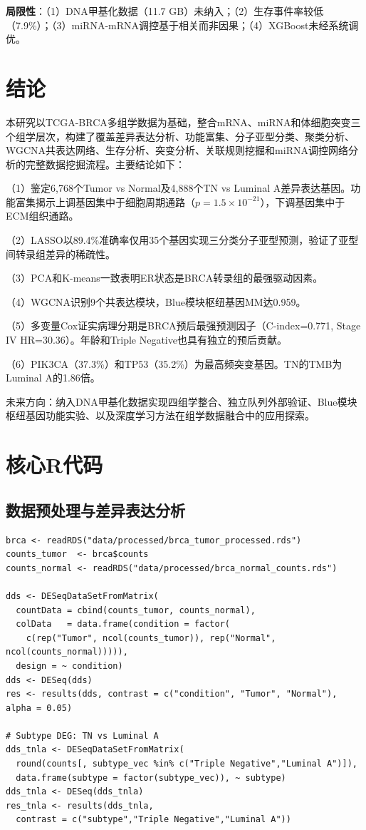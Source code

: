 \documentclass[12pt,a4paper]{ctexart}
\begin{document}
\textbf{局限性}：（1）DNA甲基化数据（11.7 GB）未纳入；（2）生存事件率较低（7.9\%）；（3）miRNA-mRNA调控基于相关而非因果；（4）XGBoost未经系统调优。

\section{结论}
本研究以TCGA-BRCA多组学数据为基础，整合mRNA、miRNA和体细胞突变三个组学层次，构建了覆盖差异表达分析、功能富集、分子亚型分类、聚类分析、WGCNA共表达网络、生存分析、突变分析、关联规则挖掘和miRNA调控网络分析的完整数据挖掘流程。主要结论如下：

（1）鉴定6,768个Tumor vs Normal及4,888个TN vs Luminal A差异表达基因。功能富集揭示上调基因集中于细胞周期通路（$p=1.5\times10^{-21}$），下调基因集中于ECM组织通路。

（2）LASSO以89.4\%准确率仅用35个基因实现三分类分子亚型预测，验证了亚型间转录组差异的稀疏性。

（3）PCA和K-means一致表明ER状态是BRCA转录组的最强驱动因素。

（4）WGCNA识别9个共表达模块，Blue模块枢纽基因MM达0.959。

（5）多变量Cox证实病理分期是BRCA预后最强预测因子（C-index=0.771, Stage IV HR=30.36）。年龄和Triple Negative也具有独立的预后贡献。

（6）PIK3CA（37.3\%）和TP53（35.2\%）为最高频突变基因。TN的TMB为Luminal A的1.86倍。

未来方向：纳入DNA甲基化数据实现四组学整合、独立队列外部验证、Blue模块枢纽基因功能实验、以及深度学习方法在组学数据融合中的应用探索。

\printbibliography

\newpage
\appendix
\section{核心R代码}

\subsection{数据预处理与差异表达分析}
\begin{lstlisting}[caption={mRNA预处理与DESeq2差异表达}, basicstyle=\ttfamily\scriptsize]
brca <- readRDS("data/processed/brca_tumor_processed.rds")
counts_tumor  <- brca$counts
counts_normal <- readRDS("data/processed/brca_normal_counts.rds")

dds <- DESeqDataSetFromMatrix(
  countData = cbind(counts_tumor, counts_normal),
  colData   = data.frame(condition = factor(
    c(rep("Tumor", ncol(counts_tumor)), rep("Normal", ncol(counts_normal))))),
  design = ~ condition)
dds <- DESeq(dds)
res <- results(dds, contrast = c("condition", "Tumor", "Normal"), alpha = 0.05)

# Subtype DEG: TN vs Luminal A
dds_tnla <- DESeqDataSetFromMatrix(
  round(counts[, subtype_vec %in% c("Triple Negative","Luminal A")]),
  data.frame(subtype = factor(subtype_vec)), ~ subtype)
dds_tnla <- DESeq(dds_tnla)
res_tnla <- results(dds_tnla,
  contrast = c("subtype","Triple Negative","Luminal A"))
\end{lstlisting}
\end{document}
